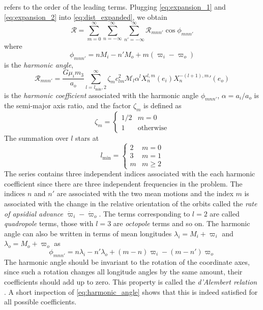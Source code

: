 refers to the order of the leading terms. Plugging \cref{eq:expansion_1}
and \cref{eq:expansion_2} into \cref{eq:dist_expanded}, we obtain
\citep{Mardling2013}
\begin{equation}
    \mathcal{R}=\sum^\infty_{m=0}\sum^\infty_{n=-\infty}\sum^\infty_{n'=-\infty}
    \mathcal{R}_{mnn'}\cos\phi_{mnn'}
    \label{eq:disturbing_function}
\end{equation}
where 
\begin{equation}
    \phi_{mnn'}=nM_i-n'M_o+m(\varpi_i-\varpi_o)
\end{equation}
is the \emph{harmonic angle},
\begin{equation}
    \mathcal{R}_{mnn'}= \frac{G\mu_im_3}{a_o} \sum^\infty_{l=l_\text{min},2}
    \zeta_m c_{lm}^2\mathcal{M}_l\alpha^l X^{l,m}_n(e_i)X^{-(l+1),m}_n'(e_o)
    \label{eq:harmonic_coefficient}
\end{equation}
is the \emph{harmonic coefficient} associated with the harmonic angle
$\phi_{mnn'}$, $\alpha=a_i/a_o$ is the semi-major axis ratio, 
and the factor $\zeta_m$ is defined as
\begin{equation}
    \zeta_m=
    \begin{cases}
        1/2 & m=0\\
        1 & \text{otherwise}
    \end{cases}
\end{equation}
The summation over $l$ stars at
\begin{equation}
    l_\text{min}=
    \begin{cases}
        2 & m=0\\
        3 & m=1\\
        m & m\geq 2
    \end{cases}
\end{equation}
The series contains three independent indices associated with the each 
harmonic coefficient since there are three independent frequencies in the 
problem. The indices $n$ and $n'$ are associated with the  two mean 
motions and the index $m$ is associated with the change in the
relative orientation of the orbits called the 
\emph{rate of apsidial advance} $\dot{\varpi}_i-\dot{\varpi}_o$. 
The terms corresponding to $l=2$ are called \emph{quadropole} 
terms, those with $l=3$ are \emph{octopole} terms and so on. The harmonic
angle can also be written in terms of mean longitudes $\lambda_i=M_i+\varpi_i$
and $\lambda_o=M_o+\varpi_o$ as
\begin{equation}
    \phi_{mnn'}=n\lambda_i-n'\lambda_o+(m-n)\varpi_i-(m-n')\varpi_o
    \label{eq:harmonic_angle}
\end{equation}
The harmonic angle should be invariant to the rotation of the coordinate axes, 
since such a rotation changes all longitude angles by the same amount, their 
coefficients should add up to zero. This property is called the 
\emph{d'Alembert relation} \citep{murray}. A short inspection of 
\cref{eq:harmonic_angle} shows that this is indeed satisfied for all possible
coefficients.

